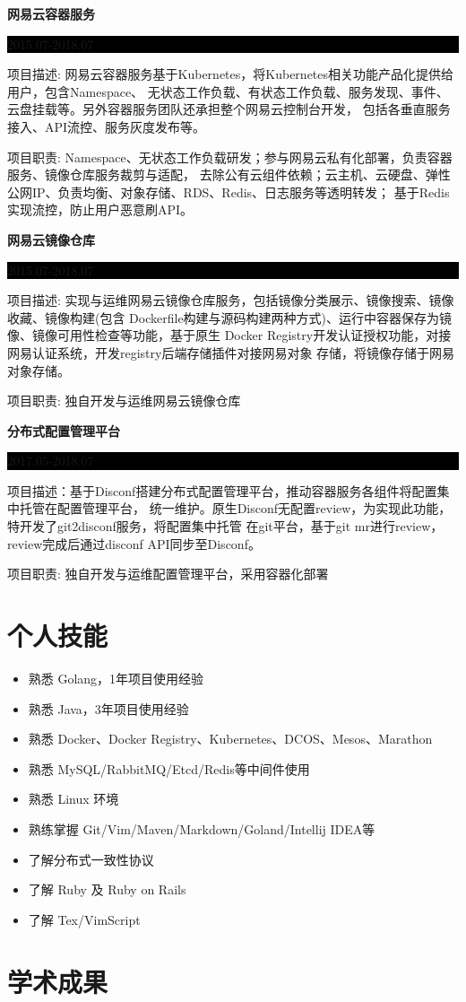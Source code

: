 \documentclass[paper=a4,fontsize=11pt]{scrartcl} %
\newcommand{\sepspace}{\vspace*{1em}}		%
\newcommand{\Section}[1]{\section*{ #1 }}          %
\newcommand{\SubSection}[2]{
	\sepspace \noindent \textbf{#1} \hfill      %
	\colorbox{Black}{\parbox{7em}{\hfill\color{White}#2}} \par  %
	\normalsize \par \sepspace}
\begin{document}
\begin{CJK}{UTF8}{gbsn}
\SubSection{网易云容器服务}{2015.07-2018.07}
项目描述: 网易云容器服务基于Kubernetes，将Kubernetes相关功能产品化提供给用户，包含Namespace、
无状态工作负载、有状态工作负载、服务发现、事件、云盘挂载等。另外容器服务团队还承担整个网易云控制台开发，
包括各垂直服务接入、API流控、服务灰度发布等。\par
\sepspace
项目职责: Namespace、无状态工作负载研发；参与网易云私有化部署，负责容器服务、镜像仓库服务裁剪与适配，
去除公有云组件依赖；云主机、云硬盘、弹性公网IP、负责均衡、对象存储、RDS、Redis、日志服务等透明转发；
基于Redis实现流控，防止用户恶意刷API。

\SubSection{网易云镜像仓库}{2015.07-2018.07}
项目描述: 实现与运维网易云镜像仓库服务，包括镜像分类展示、镜像搜索、镜像收藏、镜像构建(包含
Dockerfile构建与源码构建两种方式)、运行中容器保存为镜像、镜像可用性检查等功能，基于原生
Docker Registry开发认证授权功能，对接网易认证系统，开发registry后端存储插件对接网易对象
存储，将镜像存储于网易对象存储。\par
\sepspace
项目职责: 独自开发与运维网易云镜像仓库

\SubSection{分布式配置管理平台}{2017.05-2018.07}
项目描述：基于Disconf搭建分布式配置管理平台，推动容器服务各组件将配置集中托管在配置管理平台，
统一维护。原生Disconf无配置review，为实现此功能，特开发了git2disconf服务，将配置集中托管
在git平台，基于git mr进行review，review完成后通过disconf API同步至Disconf。\par
\sepspace
项目职责: 独自开发与运维配置管理平台，采用容器化部署

\Section{个人技能}

\begin{itemize}
	\item 熟悉 Golang，1年项目使用经验
	\item 熟悉 Java，3年项目使用经验
	\item 熟悉 Docker、Docker Registry、Kubernetes、DCOS、Mesos、Marathon
	\item 熟悉 MySQL/RabbitMQ/Etcd/Redis等中间件使用
	\item 熟悉 Linux 环境
	\item 熟练掌握 Git/Vim/Maven/Markdown/Goland/Intellij IDEA等
	\item 了解分布式一致性协议
	\item 了解 Ruby 及 Ruby on Rails
	\item 了解 Tex/VimScript
\end{itemize}

\Section{学术成果}


\end{CJK}
\end{document}

